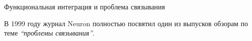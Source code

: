 \documentclass[12pt]{beamer}
\title{\small{\thesisTitle}}
\author{\small{%
\emph{Выступающий:}~\thesisAuthorShort\\%
\emph{Руководитель:}~\supervisorRegaliaShort~\supervisorFioShort}\\%
\vspace{30pt}%
\thesisOrganization%
\vspace{10pt}%
}
\date{\small{\thesisCity, \thesisYear}}
\begin{document}
\maketitle


\begin{frame}[t]{\small Функциональная интеграция и проблема связывания}

    {\footnotesize В 1999 году журнал Neuron полностью посвятил один из выпусков обзорам по теме \emph{``проблемы связывания''}}.
    \vspace{1mm}




\end{frame}
\end{document}
